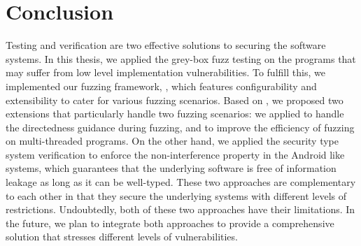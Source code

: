 
\chapter{Conclusion} \label{ch:conclusion}


Testing and verification are two effective solutions to securing the software systems. In this thesis, we applied the grey-box fuzz testing on the programs that may suffer from low level implementation vulnerabilities. To fulfill this, we implemented our fuzzing framework, \FOT, which features configurability and extensibility to cater for various fuzzing scenarios. Based on \FOT, we proposed two extensions that particularly handle two fuzzing scenarios: we applied \dFOT to handle the directedness guidance during fuzzing, and \mtfuzz to improve the efficiency of fuzzing on multi-threaded programs. On the other hand, we applied the security type system verification to enforce the non-interference property in the Android like systems, which guarantees that the underlying software is free of information leakage as long as it can be well-typed. These two approaches are complementary to each other in that they secure the underlying systems with different levels of restrictions. Undoubtedly, both of these two approaches have their limitations. In the future, we plan to integrate both approaches to provide a comprehensive solution that stresses different levels of vulnerabilities.
